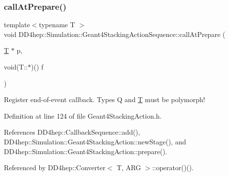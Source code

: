 \hypertarget{class_d_d4hep_1_1_simulation_1_1_geant4_stacking_action_sequence_a07b58d90b90be4b7bbdcb48f0f80ea56}{}\label{class_d_d4hep_1_1_simulation_1_1_geant4_stacking_action_sequence_a07b58d90b90be4b7bbdcb48f0f80ea56} 
\subsubsection{\texorpdfstring{call\+At\+Prepare()}{callAtPrepare()}}
{\footnotesize\ttfamily template$<$typename T $>$ \\
void D\+D4hep\+::\+Simulation\+::\+Geant4\+Stacking\+Action\+Sequence\+::call\+At\+Prepare (\begin{DoxyParamCaption}\item[{\hyperlink{class_t}{T} $\ast$}]{p,  }\item[{void(T\+::$\ast$)()}]{f }\end{DoxyParamCaption})\hspace{0.3cm}{\ttfamily [inline]}}



Register end-\/of-\/event callback. Types Q and \hyperlink{class_t}{T} must be polymorph! 



Definition at line 124 of file Geant4\+Stacking\+Action.\+h.



References D\+D4hep\+::\+Callback\+Sequence\+::add(), D\+D4hep\+::\+Simulation\+::\+Geant4\+Stacking\+Action\+::new\+Stage(), and D\+D4hep\+::\+Simulation\+::\+Geant4\+Stacking\+Action\+::prepare().



Referenced by D\+D4hep\+::\+Converter$<$ T, A\+R\+G $>$\+::operator()().

\hypertarget{class_d_d4hep_1_1_simulation_1_1_geant4_stacking_action_sequence_af292bcae909cc6b7bc4a94c0f0e07b9c}{}\label{class_d_d4hep_1_1_simulation_1_1_geant4_stacking_action_sequence_af292bcae909cc6b7bc4a94c0f0e07b9c} 
